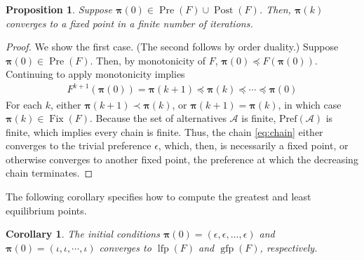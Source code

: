 \documentclass[conference]{ieeeconf}
\newcommand{\A}{\mathcal{A}}
\renewcommand{\P}{\mathcal{P}}
\newcommand{\Pref}{\mathrm{Pref}}
\renewcommand{\L}{\mathcal{L}}
\renewcommand{\leq}{\leqslant}
\DeclareMathOperator{\Fix}{Fix}
\DeclareMathOperator{\Pre}{Pre}
\DeclareMathOperator{\Post}{Post}
\DeclareMathOperator{\lfp}{lfp}
\DeclareMathOperator{\gfp}{gfp}
\newtheorem{corollary}{Corollary}
\newtheorem{proposition}{Proposition}
\newtheorem{definition}{Definition}
\begin{document}



\begin{proposition} \label{prop:initial-conditions}
    Suppose $\boldsymbol{\pi}(0) \in \Pre(F) \cup \Post(F)$. Then, $\boldsymbol{\pi}(k)$ converges to a fixed point in a finite number of iterations.
\end{proposition}
\begin{proof}
    We show the first case. (The second follows by order duality.) Suppose $\boldsymbol{\pi}(0) \in \Pre(F)$. Then, by monotonicity of $F$, $\boldsymbol{\pi}(0) \preceq F\left(\boldsymbol{\pi}(0) \right)$. Continuing to apply monotonicity implies
    \begin{align}
        F^{k+1}\left( \boldsymbol{\pi}(0)\right)  = \boldsymbol{\pi}(k+1) \preceq \boldsymbol{\pi}(k) \preceq \cdots \preceq \boldsymbol{\pi}(0) \label{eq:chain}
    \end{align} For each $k$, either $\boldsymbol{\pi}(k+1) \prec \boldsymbol{\pi}(k)$, or $\boldsymbol{\pi}(k+1) = \boldsymbol{\pi}(k)$, in which case $\boldsymbol{\pi}(k) \in \Fix(F)$. Because the set of alternatives $\A$ is finite, $\Pref(\A)$ is finite, which implies every chain is finite. Thus, the chain \eqref{eq:chain} either converges to the trivial preference $\epsilon$, which, then, is necessarily a fixed point, or otherwise converges to another fixed point, the preference at which the decreasing chain terminates.
\end{proof}

The following corollary specifies how to compute the greatest and least equilibrium points.

\begin{corollary}
    The initial conditions $\boldsymbol{\pi}(0) = (\epsilon,\epsilon,\dots,\epsilon)$ and $\boldsymbol{\pi}(0) = (\iota,\iota, \cdots, \iota)$ converges to $\lfp(F)$ and $\gfp(F)$, respectively.
\end{corollary}
\end{document}
